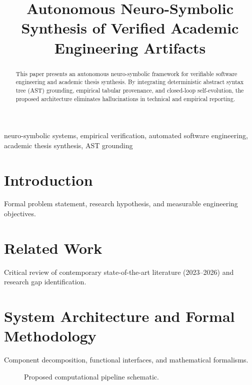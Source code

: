 \documentclass[conference]{IEEEtran}
\begin{document}
\title{Autonomous Neuro-Symbolic Synthesis of Verified Academic Engineering Artifacts}

\author{
}

\maketitle

\begin{abstract}
This paper presents an autonomous neuro-symbolic framework for verifiable software engineering and academic thesis synthesis. By integrating deterministic abstract syntax tree (AST) grounding, empirical tabular provenance, and closed-loop self-evolution, the proposed architecture eliminates hallucinations in technical and empirical reporting.
\end{abstract}

\begin{IEEEkeywords}
neuro-symbolic systems, empirical verification, automated software engineering, academic thesis synthesis, AST grounding
\end{IEEEkeywords}

\section{Introduction}
Formal problem statement, research hypothesis, and measurable engineering objectives.

\section{Related Work}
Critical review of contemporary state-of-the-art literature (2023--2026) and research gap identification.

\section{System Architecture and Formal Methodology}
Component decomposition, functional interfaces, and mathematical formalisms.
\begin{figure}[htbp]
\centering
{}
\caption{Proposed computational pipeline schematic.}
\label{fig:arch_tikz}
\end{figure}
\end{document}
